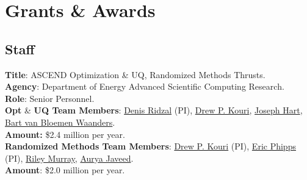 \documentclass[11pt, a4paper]{article}
\newcommand{\years}[1]{\marginnote{#1}}
\begin{document}
\section*{Grants \& Awards}
\subsection*{Staff}
\years{2024} \textbf{Title}: ASCEND Optimization \& UQ, Randomized Methods Thrusts. \\
\textbf{Agency}: Department of Energy Advanced Scientific Computing Research. \\
\textbf{Role}: Senior Personnel.\\
\textbf{Opt} \& \textbf{UQ Team Members}:
\href{https://cfwebprod.sandia.gov/cfdocs/CompResearch/templates/insert/profile.cfm?dridzal}{Denis Ridzal} (PI),
\href{https://cfwebprod.sandia.gov/cfdocs/CompResearch/templates/insert/profile.cfm?dpkouri}{Drew P. Kouri},
\href{https://www.sandia.gov/ccr/staff/joseph-lee-hart/}{Joseph Hart},
\href{https://www.sandia.gov/ccr/staff/bart-g-van-bloemen-waanders/}{Bart van Bloemen Waanders}. \\
\textbf{Amount:} \$2.4 million per year.\\
\textbf{Randomized Methods Team Members}:
\href{https://cfwebprod.sandia.gov/cfdocs/CompResearch/templates/insert/profile.cfm?dpkouri}{Drew P. Kouri} (PI),
\href{https://www.sandia.gov/ccr/staff/eric-t-phipps/}{Eric Phipps} (PI),
\href{https://rileyjmurray.wordpress.com/}{Riley Murray},
\href{https://rol.sandia.gov/team/}{Aurya Javeed}. \\
\textbf{Amount}: \$2.0 million per year.
\end{document}
